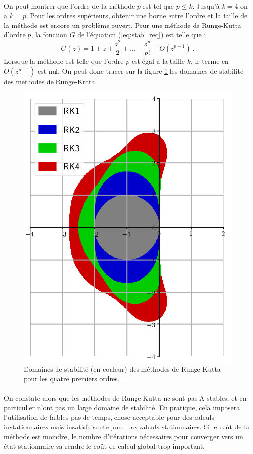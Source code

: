     \paragraph{}
    On peut montrer que l'ordre de la méthode $p$ est tel que $p \leq k$.
    Jusqu'à $k = 4$ on a $k = p$.
    Pour les ordres supérieurs, obtenir une borne entre l'ordre et la taille de la méthode est encore un problème ouvert.
    Pour une méthode de Runge-Kutta d'ordre $p$, la fonction $G$ de l'équation (\ref{eq:stab_req}) est telle que \cite{HairerWanner1996}:
    \[G\left(z\right) = 1 + z + \frac{z^2}{2} + \dots + \frac{z^p}{p!} + O\left(z^{p+1}\right)\ .\]
    Lorsque la méthode est telle que l'ordre $p$ est égal à la taille $k$, le terme en $O\left(z^{p+1}\right)$ est nul.
    On peut donc tracer sur la figure \ref{fig:rk_stab} les domaines de stabilité des méthodes de Runge-Kutta.

    \begin{figure}
      \centering
      \includegraphics[width=.45\textwidth]{images/rk_stab.png}
      \caption{Domaines de stabilité (en couleur) des méthodes de Runge-Kutta pour les quatre premiers ordres.}
      \label{fig:rk_stab}
    \end{figure}

    \paragraph{}
    On constate alors que les méthodes de Runge-Kutta ne sont pas A-stables, et en particulier n'ont pas un large domaine de stabilité.
    En pratique, cela imposera l'utilisation de faibles pas de temps, chose acceptable pour des calculs instationnaires mais insatisfaisante pour nos calculs stationnaires.
    Si le coût de la méthode est moindre, le nombre d'itérations nécessaires pour converger vers un état stationnaire va rendre le coût de calcul global trop important.


